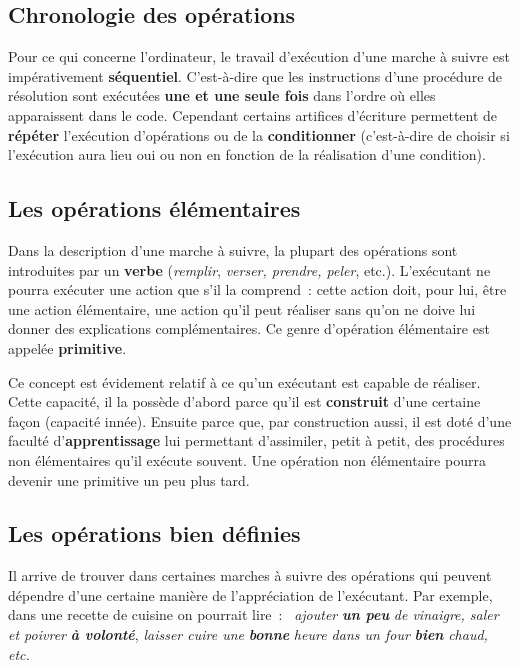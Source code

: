 		\subsection{Chronologie des opérations}
		
			Pour ce qui concerne l’ordinateur, 
			le travail d’exécution d’une marche à suivre 
			est impérativement \textbf{séquentiel}. 
			C’est-à-dire que les instructions d’une procédure de résolution 
			sont exécutées \textbf{une et une seule fois} 
			dans l’ordre où elles apparaissent dans le code.
			Cependant certains artifices d’écriture 
			permettent de \textbf{répéter} l’exécution d’opérations 
			ou de la \textbf{conditionner}
			(c’est-à-dire de choisir si l’exécution aura lieu oui ou non 
			en fonction de la réalisation d’une condition).
	
		\subsection{Les opérations élémentaires}
		
			Dans la description d’une marche à suivre, 
			la plupart des opérations sont introduites par un \textbf{verbe}
			(\textit{remplir}, \textit{verser, prendre, peler}, etc.). 
			L’exécutant ne pourra exécuter une action que s’il la comprend~:
			cette action doit, pour lui, être une action élémentaire, 
			une action qu’il peut réaliser 
			sans qu’on ne doive lui donner des explications complémentaires. 
			Ce genre d’opération élémentaire est appelée \textbf{primitive}.
			
			Ce concept est évidement relatif 
			à ce qu’un exécutant est capable de réaliser. 
			Cette capacité, il la possède d’abord 
			parce qu’il est \textbf{construit} d’une certaine façon 
			(capacité innée). 
			Ensuite parce que, par construction aussi, 
			il est doté d’une faculté d’\textbf{apprentissage} 
			lui permettant d’assimiler, petit à petit, 
			des procédures non élémentaires qu’il exécute souvent. 
			Une opération non élémentaire 
			pourra devenir une primitive un peu plus tard.
			
		\subsection{Les opérations bien définies}
		
			Il arrive de trouver dans certaines marches à suivre 
			des opérations qui peuvent dépendre d’une certaine manière 
			de l’appréciation de l’exécutant. 
			Par exemple, dans une recette de cuisine on pourrait lire~:~
			\textit{ajouter} \textbf{\textit{un peu}} 
			\textit{de vinaigre, saler et poivrer} 
			\textbf{\textit{à volonté}}, \textit{laisser cuire une} 
			\textbf{\textit{bonne}}
			\textit{ heure dans un four}
			\textbf{\textit{bien}} \textit{chaud, etc.}
			
